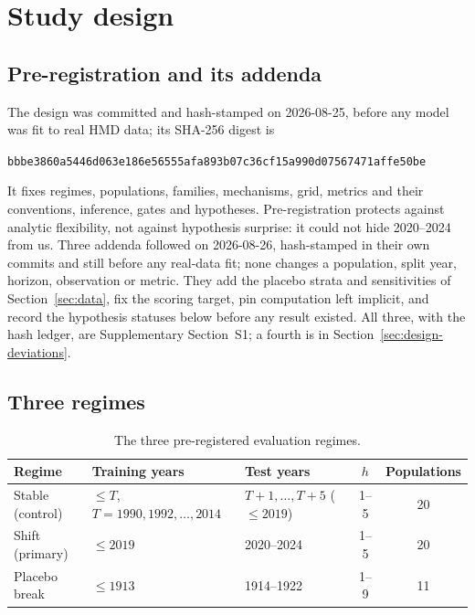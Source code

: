 \section{Study design}
\label{sec:design}

\subsection{Pre-registration and its addenda}
\label{sec:design-prereg}

The design was committed and hash-stamped on 2026-08-25, before any model was
fit to real HMD data; its SHA-256 digest is
\begin{center}
\small\texttt{bbbe3860a5446d063e186e56555afa893b07c36cf15a990d07567471affe50be}
\end{center}
It fixes regimes, populations, families, mechanisms, grid, metrics and their
conventions, inference, gates and hypotheses. Pre-registration protects against
analytic flexibility, not against hypothesis surprise: it could not hide
2020--2024 from us. Three addenda followed on 2026-08-26, hash-stamped in their
own commits and still before any real-data fit; none changes a population, split
year, horizon, observation or metric. They add the placebo strata and
sensitivities of Section~\ref{sec:data}, fix the scoring target, pin computation
left implicit, and record the hypothesis statuses below before any result
existed. All three, with the hash ledger, are Supplementary Section~S1; a fourth
is in Section~\ref{sec:design-deviations}.

\subsection{Three regimes}
\label{sec:design-regimes}

\begin{table}[htbp]\centering
\caption{The three pre-registered evaluation regimes.}
\label{tab:regimes}
\small
\begin{tabular}{@{}lllcc@{}}
\toprule
Regime & Training years & Test years & $h$ & Populations \\
\midrule
Stable (control) & $\le T$, $T=1990,1992,\dots,2014$ & $T{+}1,\dots,T{+}5$ ($\le 2019$) & 1--5 & 20 \\
Shift (primary)  & $\le 2019$ & 2020--2024 & 1--5 & 20 \\
Placebo break    & $\le 1913$ & 1914--1922 & 1--9 & 11 \\
\bottomrule
\end{tabular}
\end{table}

